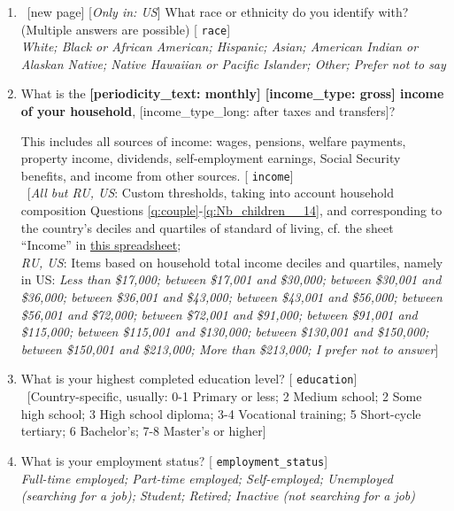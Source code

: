 \begin{enumerate}[resume]
\item ~[new page] \label{q:race} [\textit{Only in: US}] What race or ethnicity do you identify with? (Multiple answers are possible) [%
\verb|race|]
  \\ \textit{White; Black or African American; Hispanic; Asian; American Indian or Alaskan Native; Native Hawaiian or Pacific Islander; Other; Prefer not to say}

\item  \label{q:income} What is the \textbf{[periodicity\_text: monthly] [income\_type: gross] income of your household}, [income\_type\_long: after taxes and transfers]?

This includes all sources of income: wages, pensions, welfare payments, property income, dividends, self-employment earnings, Social Security benefits, and income from other sources. [%
\verb|income|]
  \\ ~[\textit{All but RU, US}: Custom thresholds, taking into account household composition Questions \ref{q:couple}-\ref{q:Nb_children__14}, and corresponding to the country's deciles and quartiles of standard of living, cf. the sheet ``Income'' in \href{https://github.com/bixiou/robustness_global_redistr/raw/main/questionnaire/source.xlsx}{this spreadsheet}; \\ \textit{RU, US}: Items based on household total income deciles and quartiles, namely in US: \textit{Less than \$17,000; between \$17,001 and \$30,000; between \$30,001 and \$36,000; between \$36,001 and \$43,000; between \$43,001 and \$56,000; between \$56,001 and \$72,000; between \$72,001 and \$91,000; between \$91,001 and \$115,000; between \$115,001 and \$130,000; between \$130,001 and \$150,000; between \$150,001 and \$213,000; More than \$213,000; I prefer not to answer}]

\item  \label{q:education} What is your highest completed education level? [%
\verb|education|]
  \\ ~[Country-specific, usually: 0-1 Primary or less; 2 Medium school; 2 Some high school; 3 High school diploma; 3-4 Vocational training; 5 Short-cycle tertiary; 6 Bachelor's; 7-8 Master's or higher]

\item  \label{q:employment_status} What is your employment status? [%
\verb|employment_status|]
  \\ \textit{Full-time employed; Part-time employed; Self-employed; Unemployed (searching for a job); Student; Retired; Inactive (not searching for a job)}


\end{enumerate}
